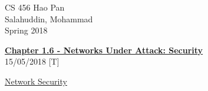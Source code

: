 \documentclass{article}
\begin{document}
\noindent
{CS 456 \hfill Hao Pan}\\
{Salahuddin, Mohammad}\\
{Spring 2018}


\begin{center}
\underline{\large \bf Chapter 1.6 - Networks Under Attack: Security}\\
\noindent
{\hfill 15/05/2018 [T]}
\end{center}

\underline{Network Security}
\end{document}
